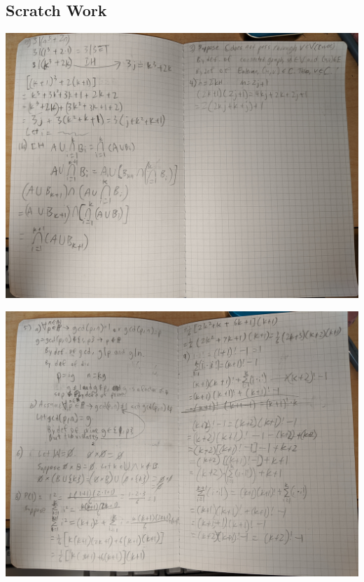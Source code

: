 \documentclass{article}
\numberwithin{subcase}{case}
\begin{document}
\begin{landscape}
    \section{Scratch Work}

    \centering
    \thispagestyle{empty}
    \includegraphics[width=0.95\linewidth]{sw1.jpg}

    \pagebreak
    
    \thispagestyle{empty}
    \includegraphics[width=0.95\linewidth]{sw2.jpg}
\end{landscape}

\restoregeometry
    
\end{document}
